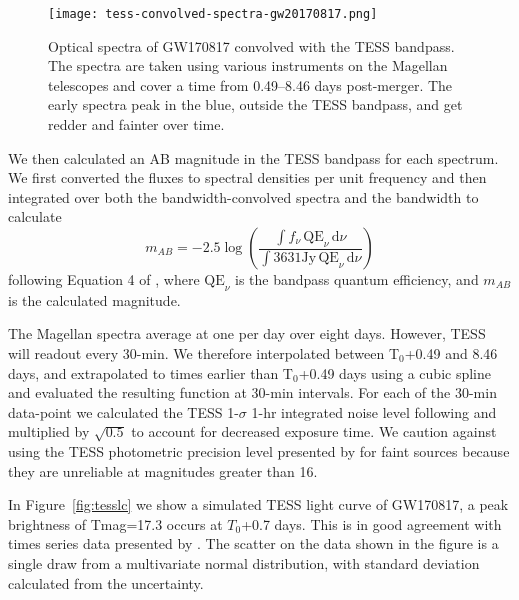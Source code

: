 \documentclass[modern]{aastex61}
\begin{document}
\begin{figure}
\centering
\texttt{[image: tess-convolved-spectra-gw20170817.png]}
\caption{Optical spectra of GW170817 convolved with the TESS bandpass. The spectra are taken using various instruments on the Magellan telescopes and cover a time from 0.49--8.46 days post-merger. The early spectra peak in the blue, outside the TESS bandpass, and get redder and fainter over time.}
\label{fig:spectra}
\end{figure}
We then calculated an AB magnitude \citep{Oke1983} in the TESS bandpass for each spectrum. We first converted the fluxes to spectral densities per unit frequency and then integrated over both the bandwidth-convolved spectra and the bandwidth to calculate
\begin{equation}
m_{AB} = -2.5\log{ \left(\frac{\int{f_\nu\, \mathrm{QE}_\nu\, \mathrm{d}\nu}}{\int{3631 \mathrm{Jy}\,  \mathrm{QE}_\nu\, \mathrm{d}\nu}} \right )}
\end{equation}
following Equation 4 of \citet{Tonry2012}, where $\mathrm{QE}_\nu$ is the bandpass quantum efficiency, and $m_{AB}$ is the calculated magnitude. 

The Magellan spectra average at one per day over eight days. However, TESS will readout every 30-min. We therefore interpolated between T$_0$+0.49 and 8.46 days, and extrapolated to times earlier than T$_0$+0.49 days using a cubic spline and evaluated the resulting function at 30-min intervals. For each of the 30-min data-point we calculated the TESS 1-$\sigma$ 1-hr integrated noise level following \citet{Ricker2015} and multiplied by $\sqrt{0.5}$ to account for decreased exposure time. We caution against using the TESS photometric precision level presented by \citet{Stassun2017} for faint sources because they are unreliable at magnitudes greater than 16. 

In Figure~\ref{fig:tesslc} we show a simulated TESS light curve of GW170817, a peak brightness of Tmag=17.3 occurs at $T_0$+0.7 days. This is in good agreement with times series data presented by \cite{Arcavi2017}. The scatter on the data shown in the figure is a single draw from a multivariate normal distribution, with standard deviation calculated from the uncertainty. 
\end{document}
